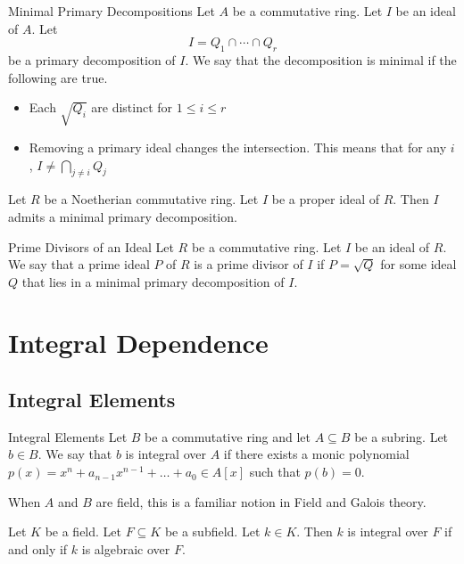 \documentclass[a4paper]{article}
\begin{document}
\begin{defn}{Minimal Primary Decompositions}{} Let $A$ be a commutative ring. Let $I$ be an ideal of $A$. Let $$I=Q_1\cap\cdots\cap Q_r$$ be a primary decomposition of $I$. We say that the decomposition is minimal if the following are true. 
\begin{itemize}
\item Each $\sqrt{Q_i}$ are distinct for $1\leq i\leq r$
\item Removing a primary ideal changes the intersection. This means that for any $i$, $I\neq\bigcap_{j\neq i}Q_j$
\end{itemize}
\end{defn}

\begin{thm}{}{} Let $R$ be a Noetherian commutative ring. Let $I$ be a proper ideal of $R$. Then $I$ admits a minimal primary decomposition. 
\end{thm}

\begin{defn}{Prime Divisors of an Ideal}{} Let $R$ be a commutative ring. Let $I$ be an ideal of $R$. We say that a prime ideal $P$ of $R$ is a prime divisor of $I$ if $P=\sqrt{Q}$ for some ideal $Q$ that lies in a minimal primary decomposition of $I$. 
\end{defn}

\pagebreak
\section{Integral Dependence}
\subsection{Integral Elements}
\begin{defn}{Integral Elements}{} Let $B$ be a commutative ring and let $A\subseteq B$ be a subring. Let $b\in B$. We say that $b$ is integral over $A$ if there exists a monic polynomial $p(x)=x^n+a_{n-1}x^{n-1}+\dots+a_0\in A[x]$ such that $p(b)=0$. 
\end{defn}

When $A$ and $B$ are field, this is a familiar notion in Field and Galois theory. 

\begin{lmm}{}{} Let $K$ be a field. Let $F\subseteq K$ be a subfield. Let $k\in K$. Then $k$ is integral over $F$ if and only if $k$ is algebraic over $F$. 
\end{lmm}
\end{document}
